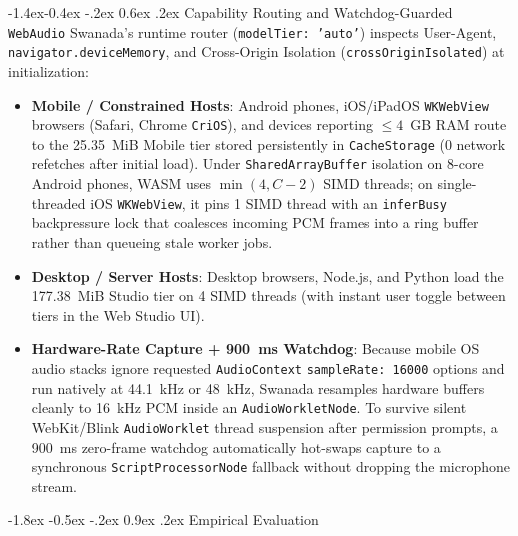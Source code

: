 \documentclass[10pt,twocolumn]{article}
\makeatletter
\renewcommand\section{\@startsection {section}{1}{\z@}%
  {-1.8ex \@plus -0.5ex \@minus -.2ex}%
  {0.9ex \@plus.2ex}%
  {\normalfont\large\bfseries}}
\renewcommand\subsection{\@startsection{subsection}{2}{\z@}%
  {-1.4ex\@plus -0.4ex \@minus -.2ex}%
  {0.6ex \@plus .2ex}%
  {\normalfont\normalsize\bfseries}}
\makeatother
\begin{document}
\subsection{Capability Routing and Watchdog-Guarded \texttt{WebAudio}}
Swanada's runtime router (\texttt{modelTier: 'auto'}) inspects User-Agent, \texttt{navigator.deviceMemory}, and Cross-Origin Isolation (\texttt{crossOriginIsolated}) at initialization:
\begin{itemize}\setlength{\itemsep}{1pt}\setlength{\parskip}{0pt}
    \item \textbf{Mobile / Constrained Hosts}: Android phones, iOS/iPadOS \texttt{WKWebView} browsers (Safari, Chrome \texttt{CriOS}), and devices reporting $\le 4$~GB RAM route to the 25.35~MiB Mobile tier stored persistently in \texttt{CacheStorage} (0 network refetches after initial load). Under \texttt{SharedArrayBuffer} isolation on 8-core Android phones, WASM uses $\min(4, C - 2)$ SIMD threads; on single-threaded iOS \texttt{WKWebView}, it pins 1 SIMD thread with an \texttt{inferBusy} backpressure lock that coalesces incoming PCM frames into a ring buffer rather than queueing stale worker jobs.
    \item \textbf{Desktop / Server Hosts}: Desktop browsers, Node.js, and Python load the 177.38~MiB Studio tier on 4 SIMD threads (with instant user toggle between tiers in the Web Studio UI).
    \item \textbf{Hardware-Rate Capture + 900~ms Watchdog}: Because mobile OS audio stacks ignore requested \texttt{AudioContext} \texttt{sampleRate:\,16000} options and run natively at 44.1~kHz or 48~kHz, Swanada resamples hardware buffers cleanly to 16~kHz PCM inside an \texttt{AudioWorkletNode}. To survive silent WebKit/Blink \texttt{AudioWorklet} thread suspension after permission prompts, a 900~ms zero-frame watchdog automatically hot-swaps capture to a synchronous \texttt{ScriptProcessorNode} fallback without dropping the microphone stream.
\end{itemize}

\section{Empirical Evaluation}
\label{sec:eval}
\end{document}
